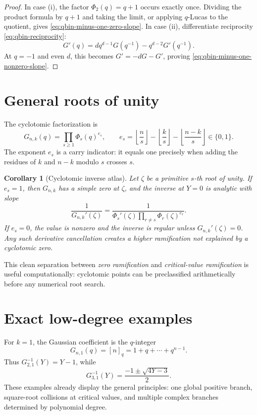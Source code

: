 \documentclass[11pt,a4paper,oneside,openany]{book}
\newtheorem{corollary}[theorem]{Corollary}
\theoremstyle{definition}
\theoremstyle{remark}
\begin{document}
\begin{proof}
In case (i), the factor \(\Phi_2(q)=q+1\) occurs exactly once.  Dividing the
product formula by \(q+1\) and taking the limit, or applying \(q\)-Lucas to
the quotient, gives \eqref{eq:qbin-minus-one-zero-slope}.  In case (ii),
differentiate reciprocity \eqref{eq:qbin-reciprocity}:
\[
 G'(q)=dq^{d-1}G(q^{-1})-q^{d-2}G'(q^{-1}).
\]
At \(q=-1\) and even \(d\), this becomes
\(G'=-dG-G'\), proving \eqref{eq:qbin-minus-one-nonzero-slope}.
\end{proof}

\section{General roots of unity}

The cyclotomic factorization is
\begin{equation}\label{eq:qbin-cyclotomic}
 G_{n,k}(q)=\prod_{s\ge1}\Phi_s(q)^{e_s},
 \qquad
 e_s=\left\lfloor\frac ns\right\rfloor
 -\left\lfloor\frac ks\right\rfloor
 -\left\lfloor\frac{n-k}s\right\rfloor\in\{0,1\}.
\end{equation}
The exponent \(e_s\) is a carry indicator: it equals one precisely when
adding the residues of \(k\) and \(n-k\) modulo \(s\) crosses \(s\).

\begin{corollary}[Cyclotomic inverse atlas]\label{cor:cyclotomic-atlas}
Let \(\zeta\) be a primitive \(s\)-th root of unity.
If \(e_s=1\), then \(G_{n,k}\) has a simple zero at \(\zeta\), and the
inverse at \(Y=0\) is analytic with slope
\[
 \frac1{G_{n,k}'(\zeta)}
 =\frac1{\Phi_s'(\zeta)
 \prod_{r\ne s}\Phi_r(\zeta)^{e_r}}.
\]
If \(e_s=0\), the value is nonzero and the inverse is regular unless
\(G_{n,k}'(\zeta)=0\).  Any such derivative cancellation creates a
higher ramification not explained by a cyclotomic zero.
\end{corollary}

This clean separation between \emph{zero ramification} and
\emph{critical-value ramification} is useful computationally: cyclotomic
points can be preclassified arithmetically before any numerical root search.

\section{Exact low-degree examples}

For \(k=1\), the Gaussian coefficient is the \(q\)-integer
\[
 G_{n,1}(q)=[n]_q=1+q+\cdots+q^{n-1}.
\]
Thus \(G_{2,1}^{-1}(Y)=Y-1\), while
\[
 G_{3,1}^{-1}(Y)=\frac{-1\pm\sqrt{4Y-3}}2.
\]
These examples already display the general principles: one global positive
branch, square-root collisions at critical values, and multiple complex
branches determined by polynomial degree.
\end{document}
